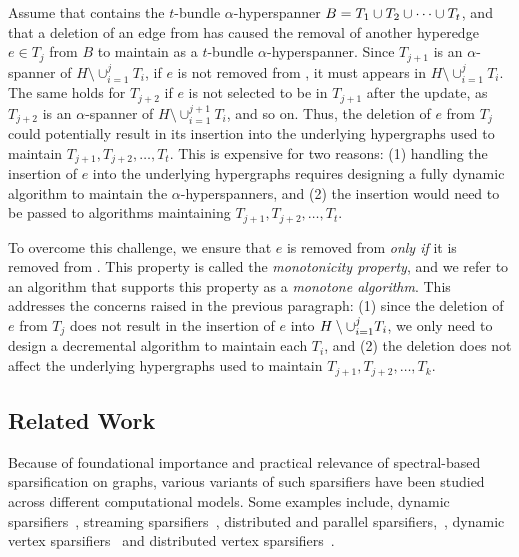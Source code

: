 Assume that  contains the \( t \)-bundle \( \alpha \)-hyperspanner  \( { B} = { T_1} \cup {\ensuremath{ T_2}} \cup \dots \cup {\ensuremath{ T_t}} \), and that a deletion of an edge from  has caused the removal of another hyperedge \( e \in T_j \) from \( B \) to maintain  as a \( t \)-bundle \( \alpha \)-hyperspanner.
Since \( T_{j+1} \) is an \( \alpha \)-spanner of \( H \setminus \cup _{i = 1} ^j T_i \), if \( e \) is not removed from , it must appears in \( H \setminus \cup _{i = 1} ^j T_i \).
The same holds for \( T_{j+2} \) if \( e \) is not selected to be in \( T_{j+1} \) after the update, as \( T_{j+2} \) is an \( \alpha \)-spanner of \( H \setminus \cup _{i = 1} ^{j + 1} T_i \), and so on.
Thus, the deletion of \( e \) from \( T_j \) could potentially result in its insertion into the underlying hypergraphs used to maintain \( T_{j + 1}, T_{j + 2}, \dots, T_{t} \).
This is expensive for two reasons: (1) handling the insertion of \( e \) into the underlying hypergraphs requires designing a fully dynamic algorithm to maintain the \( \alpha \)-hyperspanners, and (2) the insertion would need to be passed to  algorithms maintaining \( T_{j + 1}, T_{j+2}, \dots, T_{t} \).

To overcome this challenge, we ensure that \( e \) is removed from  \textit{only if} it is removed from .
This property is called the \textit{monotonicity property}, and we refer to an algorithm that supports this property as a \textit{monotone algorithm}.
This addresses the concerns raised in the previous paragraph: (1) since the deletion of \( e \) from \( T_j \) does not result in the insertion of \( e \) into \( { H} \setminus \cup_{i = 1} ^j { T_i}  \), we only need to design a decremental algorithm to maintain each \( T_i \), and (2) the deletion does not affect the underlying hypergraphs used to maintain \( T_{j + 1}, T_{j+2}, \dots, T_{k} \).

\subsection{Related Work}
Because of foundational importance and practical relevance of spectral-based sparsification on graphs, various variants of such sparsifiers have been studied across different computational models. Some examples include, dynamic sparsifiers~\cite{Bernstein:2022aa}, streaming sparsifiers~\cite{Kelner:2013aa,Kapralov:2017aa,Kapralov:2019aa}, distributed and parallel sparsifiers,~\cite{Koutis:2016aa}, dynamic vertex sparsifiers~\cite{Goranci:2018aa,Durfee:2019aa,Chen:2020ac,Gao:2021aa,Axiotis:2021aa,Brand:2022aa,Dong:2022aa} and distributed vertex sparsifiers~\cite{Zhu:2021aa,Forster:2021aa}.










